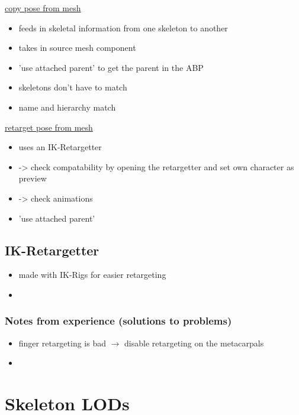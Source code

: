     
    \uline{copy pose from mesh}  
    \begin{itemize}
        \item feeds in skeletal information from one skeleton to another
        \item takes in source mesh component
        \item 'use attached parent' to get the parent in the ABP
        \item skeletons don't have to match
        \item name and hierarchy match
    \end{itemize}
	
    \uline{retarget pose from mesh}
    \begin{itemize}
        \item uses an IK-Retargetter
        \item -> check compatability by opening the retargetter and set own character as preview
        \item -> check animations
        \item 'use attached parent'
    \end{itemize}
    
    \subsection{IK-Retargetter}
        \begin{itemize}
            \item made with IK-Rigs for easier retargeting
            \item 
        \end{itemize}
        \subsubsection{Notes from experience (solutions to problems) }
            \begin{itemize}
                \item finger retargeting is bad $\rightarrow$ disable  retargeting on the metacarpals
                \item 
            \end{itemize}


    \section{Skeleton LODs}
        

